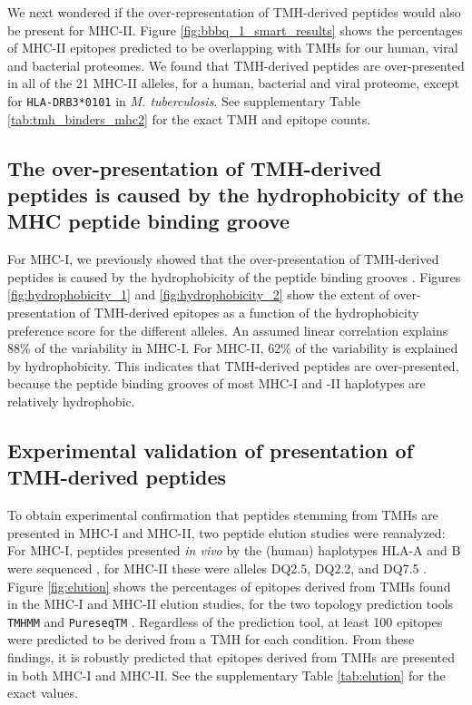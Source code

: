 We next wondered if the over-representation of TMH-derived peptides 
would also be present for MHC-II. 
Figure \ref{fig:bbbq_1_smart_results} shows the percentages of MHC-II epitopes 
predicted to be overlapping with TMHs for our human, viral and bacterial proteomes.
We found that TMH-derived peptides are over-presented in all
of the 21 MHC-II alleles, 
for a human, bacterial and viral proteome,
except for \verb;HLA-DRB3*0101; in \emph{M. tuberculosis}.
See supplementary Table \ref{tab:tmh_binders_mhc2} 
for the exact TMH and epitope counts.

\subsection{The over-presentation of TMH-derived peptides is caused by the hydrophobicity of the MHC peptide binding groove}

For MHC-I, we previously showed that the over-presentation of TMH-derived 
peptides is caused by the hydrophobicity of the peptide binding 
grooves \cite{bianchi2017}. 
Figures \ref{fig:hydrophobicity_1} and \ref{fig:hydrophobicity_2}
show the extent of over-presentation
of TMH-derived epitopes as a function of the hydrophobicity preference score 
for the different alleles.
An assumed linear correlation explains 88\% of the variability in MHC-I.
For MHC-II, 62\% of the variability is explained by hydrophobicity. 
This indicates that TMH-derived peptides are over-presented, 
because the peptide binding grooves of most MHC-I and -II haplotypes 
are relatively hydrophobic.

\subsection{Experimental validation of presentation of TMH-derived peptides}

To obtain experimental confirmation that peptides stemming from TMHs 
are presented in MHC-I and MHC-II,
two peptide elution studies were reanalyzed:
For MHC-I, peptides presented \emph{in vivo} 
by the (human) haplotypes HLA-A and B 
were sequenced \cite{schellens2015comprehensive},
for MHC-II these were alleles DQ2.5, DQ2.2, and 
DQ7.5 \cite{bergseng2015different}.
Figure \ref{fig:elution} shows the percentages of epitopes derived 
from TMHs
found in the MHC-I and MHC-II elution 
studies,
for the two topology prediction tools \verb;TMHMM; \cite{krogh2001predicting} 
and \verb;PureseqTM; \cite{wang2019efficient}. 
Regardless of the prediction tool, 
at least 100 epitopes were predicted to be derived from a TMH for each condition. 
From these findings, it is robustly predicted that
epitopes derived from TMHs are presented in both MHC-I and MHC-II.
See the supplementary Table \ref{tab:elution} for the exact values.

